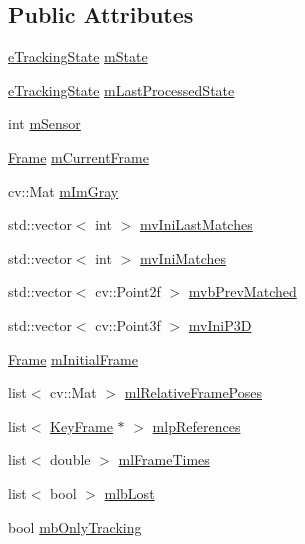 \subsection*{Public Attributes}
\begin{DoxyCompactItemize}
\item 
\mbox{\hyperlink{class_o_r_b___s_l_a_m2_1_1_tracking_a3995b5e23b910c6ee30b7fe21732fe36}{e\+Tracking\+State}} \mbox{\hyperlink{class_o_r_b___s_l_a_m2_1_1_tracking_a37cadc53a335fd802fed2fd9b24e93e1}{m\+State}}
\item 
\mbox{\hyperlink{class_o_r_b___s_l_a_m2_1_1_tracking_a3995b5e23b910c6ee30b7fe21732fe36}{e\+Tracking\+State}} \mbox{\hyperlink{class_o_r_b___s_l_a_m2_1_1_tracking_a98be1e579a7e9271449d079c4f3c8769}{m\+Last\+Processed\+State}}
\item 
int \mbox{\hyperlink{class_o_r_b___s_l_a_m2_1_1_tracking_a18bffeb950dd18e5d74807cd9741c013}{m\+Sensor}}
\item 
\mbox{\hyperlink{class_o_r_b___s_l_a_m2_1_1_frame}{Frame}} \mbox{\hyperlink{class_o_r_b___s_l_a_m2_1_1_tracking_ad21299ab1995c8fb7115bda57773d307}{m\+Current\+Frame}}
\item 
cv\+::\+Mat \mbox{\hyperlink{class_o_r_b___s_l_a_m2_1_1_tracking_af7ef78c9eed81f0701a1d12b3f377875}{m\+Im\+Gray}}
\item 
std\+::vector$<$ int $>$ \mbox{\hyperlink{class_o_r_b___s_l_a_m2_1_1_tracking_ace08a986d9cbe3fe578c189242b94489}{mv\+Ini\+Last\+Matches}}
\item 
std\+::vector$<$ int $>$ \mbox{\hyperlink{class_o_r_b___s_l_a_m2_1_1_tracking_a1c89fa1b3512238f15283857ed94c79a}{mv\+Ini\+Matches}}
\item 
std\+::vector$<$ cv\+::\+Point2f $>$ \mbox{\hyperlink{class_o_r_b___s_l_a_m2_1_1_tracking_a9ee7c26c1db845fef73c55ee0bb5c9f2}{mvb\+Prev\+Matched}}
\item 
std\+::vector$<$ cv\+::\+Point3f $>$ \mbox{\hyperlink{class_o_r_b___s_l_a_m2_1_1_tracking_adced44c2c047c18f3db6c7bfd7b289f0}{mv\+Ini\+P3D}}
\item 
\mbox{\hyperlink{class_o_r_b___s_l_a_m2_1_1_frame}{Frame}} \mbox{\hyperlink{class_o_r_b___s_l_a_m2_1_1_tracking_a691ba65eb45f76829c8a2622f42ba446}{m\+Initial\+Frame}}
\item 
list$<$ cv\+::\+Mat $>$ \mbox{\hyperlink{class_o_r_b___s_l_a_m2_1_1_tracking_a5e0bb2d9fe720c4f4dc9eef57ad1f168}{ml\+Relative\+Frame\+Poses}}
\item 
list$<$ \mbox{\hyperlink{class_o_r_b___s_l_a_m2_1_1_key_frame}{Key\+Frame}} $\ast$ $>$ \mbox{\hyperlink{class_o_r_b___s_l_a_m2_1_1_tracking_ad214f6515a2cf4996d0c7765d9de73a8}{mlp\+References}}
\item 
list$<$ double $>$ \mbox{\hyperlink{class_o_r_b___s_l_a_m2_1_1_tracking_ae867f703e70c18b7ff0798191807cb4d}{ml\+Frame\+Times}}
\item 
list$<$ bool $>$ \mbox{\hyperlink{class_o_r_b___s_l_a_m2_1_1_tracking_aca83e100e47cfcc0cba1bcfac72764cc}{mlb\+Lost}}
\item 
bool \mbox{\hyperlink{class_o_r_b___s_l_a_m2_1_1_tracking_ae8c6db8ff320af10acacd5078a0801f6}{mb\+Only\+Tracking}}
\end{DoxyCompactItemize}
